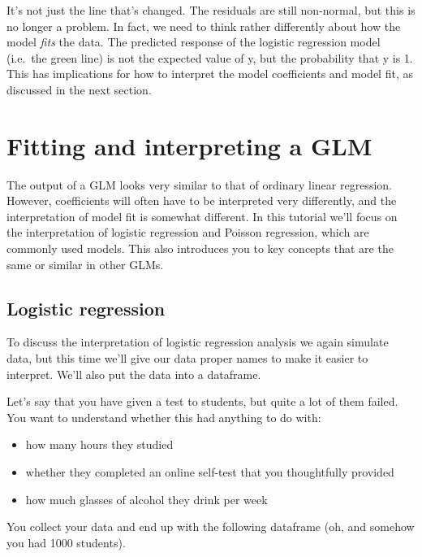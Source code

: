\documentclass[
]{article}
\providecommand{\tightlist}{%
  \setlength{\itemsep}{0pt}\setlength{\parskip}{0pt}}
\begin{document}
It's not just the line that's changed. The residuals are still
non-normal, but this is no longer a problem. In fact, we need to think
rather differently about how the model \emph{fits} the data. The
predicted response of the logistic regression model (i.e.~the green
line) is not the expected value of y, but the probability that y is 1.
This has implications for how to interpret the model coefficients and
model fit, as discussed in the next section.

\hypertarget{fitting-and-interpreting-a-glm}{%
\section{Fitting and interpreting a
GLM}\label{fitting-and-interpreting-a-glm}}

The output of a GLM looks very similar to that of ordinary linear
regression. However, coefficients will often have to be interpreted very
differently, and the interpretation of model fit is somewhat different.
In this tutorial we'll focus on the interpretation of logistic
regression and Poisson regression, which are commonly used models. This
also introduces you to key concepts that are the same or similar in
other GLMs.

\hypertarget{logistic-regression}{%
\subsection{Logistic regression}\label{logistic-regression}}

To discuss the interpretation of logistic regression analysis we again
simulate data, but this time we'll give our data proper names to make it
easier to interpret. We'll also put the data into a dataframe.

Let's say that you have given a test to students, but quite a lot of
them failed. You want to understand whether this had anything to do
with:

\begin{itemize}
\tightlist
\item
  how many hours they studied
\item
  whether they completed an online self-test that you thoughtfully
  provided
\item
  how much glasses of alcohol they drink per week
\end{itemize}

You collect your data and end up with the following dataframe (oh, and
somehow you had 1000 students).
\end{document}

